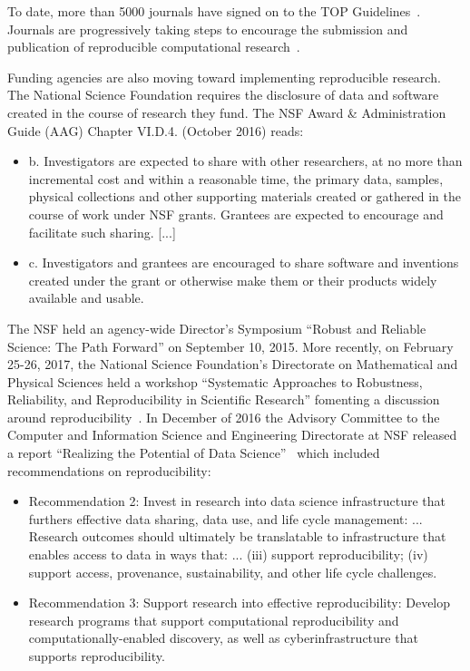 \documentclass[review]{elsarticle}
\begin{document}
To date, more than 5000 journals have signed on to the TOP Guidelines~\cite{nosek1422,victoria07}. 
Journals are progressively taking steps to encourage the submission and publication of reproducible computational research~\cite{victoria10}. 

Funding agencies are also moving toward implementing reproducible research. The National Science Foundation requires the disclosure of data and software created in the course of research they fund. The NSF Award \& Administration Guide (AAG) Chapter VI.D.4. (October 2016) reads:

\begin{itemize}
\item b.	Investigators are expected to share with other researchers, at no more than incremental cost and within a reasonable time, the primary data, samples, physical collections and other supporting materials created or gathered in the course of work under NSF grants. Grantees are expected to encourage and facilitate such sharing. [...]

\item c.	Investigators and grantees are encouraged to share software and inventions created under the grant or otherwise make them or their products widely available and usable.

\end{itemize}

The NSF held an agency-wide Director's Symposium ``Robust and Reliable Science: The Path Forward'' on September 10, 2015. More recently, on February 25-26, 2017, the National Science Foundation's Directorate on Mathematical and Physical Sciences held a workshop ``Systematic Approaches to Robustness, Reliability, and Reproducibility in Scientific Research'' fomenting a discussion around reproducibility~\cite{victoria11}. In December of 2016 the Advisory Committee to the Computer and Information Science and Engineering Directorate at NSF released a report ``Realizing the Potential of Data Science''~\cite{victoria12} which included recommendations on reproducibility:

\begin{itemize}
\item Recommendation 2: Invest in research into data science infrastructure that furthers effective data sharing, data use, and life cycle management: ... Research outcomes should ultimately be translatable to infrastructure that enables access to data in ways that: ... (iii) support reproducibility; (iv) support access, provenance, sustainability, and other life cycle challenges.
\item Recommendation 3: Support research into effective reproducibility: Develop research programs that support computational reproducibility and computationally-enabled discovery, as well as cyberinfrastructure that supports reproducibility.
\end{itemize}
\end{document}
